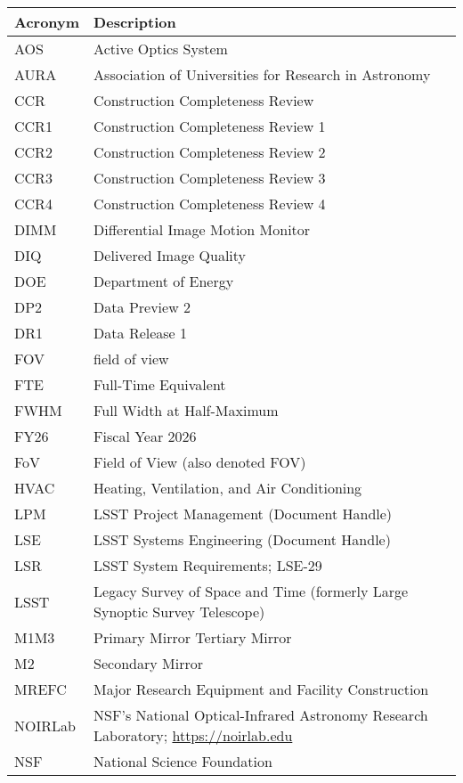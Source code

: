\addtocounter{table}{-1}
\begin{longtable}{p{}p{}}\hline
\textbf{Acronym} & \textbf{Description}  \\\hline

AOS & Active Optics System \\\hline
AURA & Association of Universities for Research in Astronomy \\\hline
CCR & Construction Completeness Review \\\hline
CCR1 & Construction Completeness Review 1 \\\hline
CCR2 & Construction Completeness Review 2 \\\hline
CCR3 & Construction Completeness Review 3 \\\hline
CCR4 & Construction Completeness Review 4 \\\hline
DIMM & Differential Image Motion Monitor \\\hline
DIQ & Delivered Image Quality \\\hline
DOE & Department of Energy \\\hline
DP2 & Data Preview 2 \\\hline
DR1 & Data Release 1 \\\hline
FOV & field of view \\\hline
FTE & Full-Time Equivalent \\\hline
FWHM & Full Width at Half-Maximum \\\hline
FY26 & Fiscal Year 2026 \\\hline
FoV & Field of View (also denoted FOV) \\\hline
HVAC & Heating, Ventilation, and Air Conditioning \\\hline
LPM & LSST Project Management (Document Handle) \\\hline
LSE & LSST Systems Engineering (Document Handle) \\\hline
LSR & LSST System Requirements; LSE-29 \\\hline
LSST & Legacy Survey of Space and Time (formerly Large Synoptic Survey Telescope) \\\hline
M1M3 & Primary Mirror Tertiary Mirror \\\hline
M2 & Secondary Mirror \\\hline
MREFC & Major Research Equipment and Facility Construction \\\hline
NOIRLab & NSF's National Optical-Infrared Astronomy Research Laboratory; \url{https://noirlab.edu} \\\hline
NSF & National Science Foundation \\\hline

\end{longtable}
